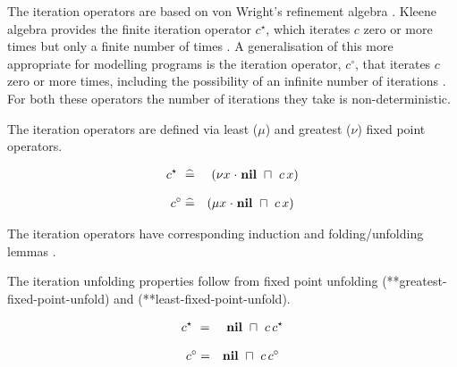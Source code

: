 \documentclass[fleqn]{fac}
\makeatletter
\def\refaxiom{\@ifnextchar*{\@refaxiom}{\@@refaxiom}}
\def\@refaxiom*#1{\ref{axiom-#1}\index{Axiom!#1|LawUse}}
\def\@@refaxiom#1{axiom~(\ref{axiom-#1})\index{Axiom!#1|LawUse}}
\newcommand{\labelproperty}[1]{\label{property-#1}\index{Property!#1|PropertyDef{\ref{property-#1}}}}
\newcommand{\labeldefinition}[1]{\label{def-#1}\index{Definition!#1|DefinitionDef{\ref{def-#1}}}}
\newcommand{\SSeq}{\,}
\newcommand{\Nil}{\Keyword{nil}}
\newcommand{\sdefs}{\mathrel{\widehat=}}\newcommand{\spot}{\mathrel{{\cdot}}}\newcommand{\where}{\mathrel{|}}\renewcommand{\implies}{\mathrel{\Rightarrow}}\newcommand{\emptyrel}{\emptyset}
\newcommand{\nondet}{\mathbin{\sqcap}}
\newcommand{\finiterec}{\nu}
\newcommand{\infiniterec}{\mu}
\newcommand{\Keyword}[1]{\mathsf{\mathbf{#1}}}
\newcommand{\itkleene}[1]{#1^{\star}}
\newcommand{\FinOrInfIter}{^{\circ}}
\newcommand{\itomega}[1]{#1\FinOrInfIter}
\makeatother
\begin{document}
The iteration operators are based on von Wright's refinement algebra \cite{Wright04}.
Kleene algebra provides the finite iteration operator $\itkleene{c}$,
which iterates $c$ zero or more times
but only a finite number of times \cite{conway71,Blikle78,kozen97kleene}.
A generalisation of this more appropriate for modelling programs is
the iteration operator, $\itomega{c}$, 
that iterates $c$ zero or more times, 
including the possibility of an infinite number of iterations \cite{Wright04}.
For both these operators the number of iterations they take is 
non-deterministic.
\begin{definitionx}[iteration]
The iteration operators are defined via least ($\mu$) and greatest ($\nu$) 
fixed point operators. \\[-1ex]
\begin{minipage}{0.5\textwidth}
\begin{eqnarray}
  \itkleene{c} & ~\sdefs~ & (\finiterec x \spot \Nil ~\nondet~ c \SSeq x)
    \labeldefinition{kleene-iteration-skip} 
\end{eqnarray}
\end{minipage}
\begin{minipage}{0.49\textwidth}
\begin{eqnarray}
  \itomega{c}  & \sdefs & (\infiniterec x \spot \Nil ~\nondet~ c \SSeq x) 
    \labeldefinition{omega-iteration-skip} 
\end{eqnarray}
\end{minipage}
\end{definitionx}
The iteration operators have corresponding induction and folding/unfolding lemmas
\cite{BackWright98,BackWright99,Wright04}.
\begin{lemmax}
The iteration unfolding properties follow from fixed point unfolding (\refaxiom*{greatest-fixed-point-unfold}) 
and (\refaxiom*{least-fixed-point-unfold}).
\\[-1ex]
\begin{minipage}{0.5\textwidth}
\begin{eqnarray}
  \itkleene{c} & ~=~ & \Nil ~\nondet~ c \SSeq \itkleene{c} 
    \labelproperty{kleene-unfold}
\end{eqnarray}
\end{minipage}
\begin{minipage}{0.49\textwidth}
\begin{eqnarray}
  \itomega{c}  & = & \Nil ~\nondet~ c \SSeq \itomega{c}
    \labelproperty{omega-unfold} 
\end{eqnarray}
\end{minipage}
\end{lemmax}
\end{document}
